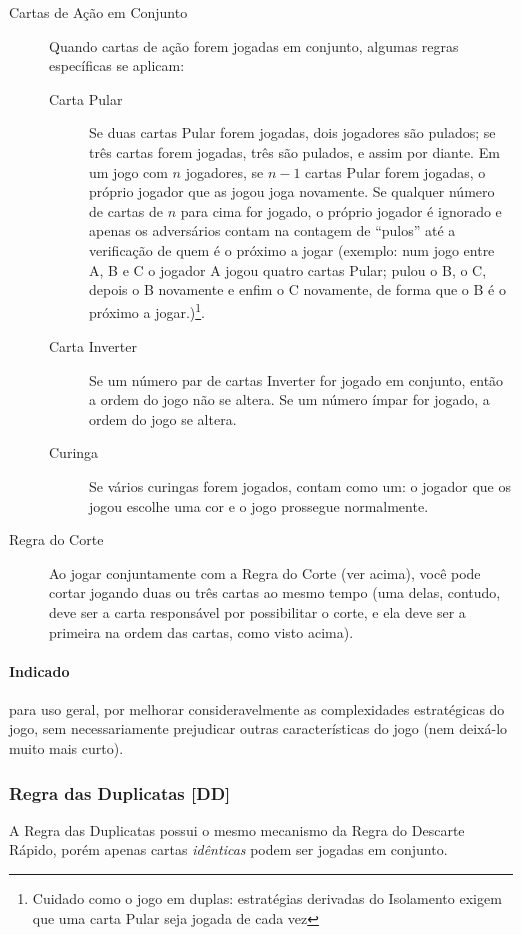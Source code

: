 \begin{description}
\item[Cartas de Ação em Conjunto]{Quando cartas de ação forem jogadas em conjunto, algumas regras específicas se aplicam:
\begin{description}
\item[Carta Pular]{Se duas cartas Pular forem jogadas, dois jogadores são pulados; se três cartas forem jogadas, três são pulados, e assim por diante. Em um jogo com $n$ jogadores, se $n - 1$ cartas Pular forem jogadas, o próprio jogador que as jogou joga novamente. Se qualquer número de cartas de $n$ para cima for jogado, o próprio jogador é ignorado e apenas os adversários contam na contagem de ``pulos'' até a verificação de quem é o próximo a jogar (exemplo: num jogo entre A, B e C o jogador A jogou quatro cartas Pular; pulou o B, o C, depois o B novamente e enfim o C novamente, de forma que o B é o próximo a jogar.)\footnote{Cuidado como o jogo em duplas: estratégias derivadas do Isolamento exigem que uma carta Pular seja jogada de cada vez}.}
\item[Carta Inverter]{Se um número par de cartas Inverter for jogado em conjunto, então a ordem do jogo não se altera. Se um número ímpar for jogado, a ordem do jogo se altera.}
\item[Curinga]{Se vários curingas forem jogados, contam como um: o jogador que os jogou escolhe uma cor e o jogo prossegue normalmente.}
\end{description}
}
\item[Regra do Corte]{Ao jogar conjuntamente com a Regra do Corte (ver acima), você pode cortar jogando duas ou três cartas ao mesmo tempo (uma delas, contudo, deve ser a carta responsável por possibilitar o corte, e ela deve ser a primeira na ordem das cartas, como visto acima).}
\end{description}

\paragraph{Indicado} 

para uso geral, por melhorar consideravelmente as complexidades estratégicas do jogo, sem necessariamente prejudicar outras características do jogo (nem deixá-lo muito mais curto).

\subsubsection{Regra das Duplicatas [DD]}

A Regra das Duplicatas possui o mesmo mecanismo da Regra do Descarte Rápido, porém apenas cartas \emph{idênticas} podem ser jogadas em conjunto.

